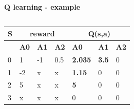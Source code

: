 \documentclass[xcolor=dvipsnames]{beamer}
\begin{document}
\begin{frame}{\bf Q learning - example}
\begin{columns}
\begin{column}{0.5\textwidth}
{    \begin{table}[]
    \begin{tabular}{|l|l|l|l|l|l|l|}
    \hline
    \textbf{S} & \multicolumn{3}{c|}{\textbf{reward}} & \multicolumn{3}{c|}{\textbf{Q(s,a)}} \\ \hline
    \textbf{}  & \textbf{A0}       & \textbf{A1}      & \textbf{A2} & \textbf{A0}       & \textbf{A1}      & \textbf{A2} \\ \hline
    0          & 1                 & -1               & 0.5         & {\bf \color{red} 2.035}                 & {\bf \color{red} 3.5}                & 0 \\ \hline
    1          & -2                & x                & x           & {\bf \color{red} 1.15}                   & 0                & 0 \\ \hline
    2          & 5                 & x                & x           & {\bf \color{red} 5}                 & 0                & 0  \\ \hline
    3          & x                 & x                & x           & 0                 & 0                & 0 \\ \hline
    \end{tabular}
    \end{table}

    }

    \end{column}
\end{columns}

{\small

}
\end{frame}
\end{document}
